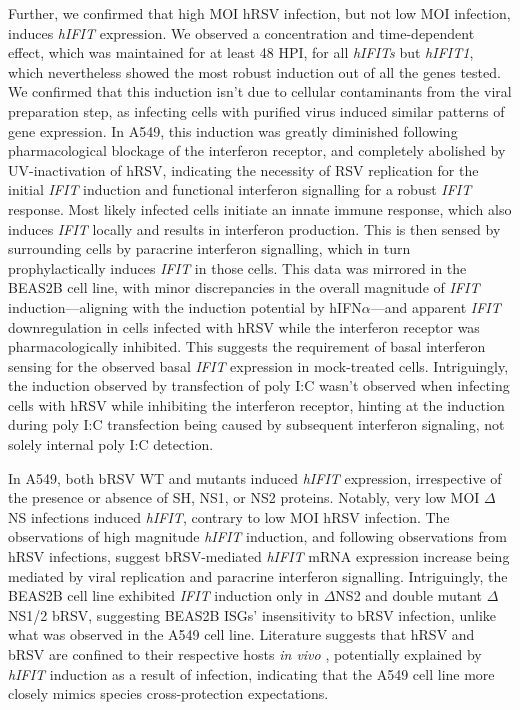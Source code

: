 Further, we confirmed that high MOI hRSV infection, but not low MOI infection, induces \textit{hIFIT} expression. We observed a concentration and time-dependent effect, which was maintained for at least 48 HPI, for all \textit{hIFITs} but \textit{hIFIT1}, which nevertheless showed the most robust induction out of all the genes tested. We confirmed that this induction isn't due to cellular contaminants from the viral preparation step, as infecting cells with purified virus induced similar patterns of gene expression.  In A549, this induction was greatly diminished following pharmacological blockage of the interferon receptor, and completely abolished by UV-inactivation of hRSV, indicating the necessity of RSV replication for the initial \textit{IFIT} induction and functional interferon signalling for a robust \textit{IFIT} response. Most likely infected cells initiate an innate immune response, which also induces \textit{IFIT} locally and results in interferon production. This is then sensed by surrounding cells by paracrine interferon signalling, which in turn prophylactically induces \textit{IFIT} in those cells. This data was mirrored in the BEAS2B cell line, with minor discrepancies in the overall magnitude of \textit{IFIT} induction—aligning with the induction potential by hIFN$\alpha$—and apparent \textit{IFIT} downregulation in cells infected with hRSV while the interferon receptor was pharmacologically inhibited. This suggests the requirement of basal interferon sensing for the observed basal \textit{IFIT} expression in mock-treated cells. Intriguingly, the induction observed by transfection of poly I:C wasn't observed when infecting cells with hRSV while inhibiting the interferon receptor, hinting at the induction during poly I:C transfection being caused by subsequent interferon signaling, not solely internal poly I:C detection.

In A549, both bRSV WT and mutants induced \textit{hIFIT} expression, irrespective of the presence or absence of SH, NS1, or NS2 proteins. Notably, very low MOI $\Delta$NS infections induced \textit{hIFIT}, contrary to low MOI hRSV infection. The observations of high magnitude \textit{hIFIT} induction, and following observations from hRSV infections, suggest bRSV-mediated \textit{hIFIT} mRNA expression increase being mediated by viral replication and paracrine interferon signalling. Intriguingly, the BEAS2B cell line exhibited \textit{IFIT} induction only in $\Delta$NS2 and double mutant $\Delta$NS1/2 bRSV, suggesting BEAS2B ISGs' insensitivity to bRSV infection, unlike what was observed in the A549 cell line. Literature suggests that hRSV and bRSV are confined to their respective hosts \textit{in vivo} \cite{Buchholz2000ChimericVaccine}, potentially explained by \textit{hIFIT} induction as a result of infection, indicating that the A549 cell line more closely mimics species cross-protection expectations.

